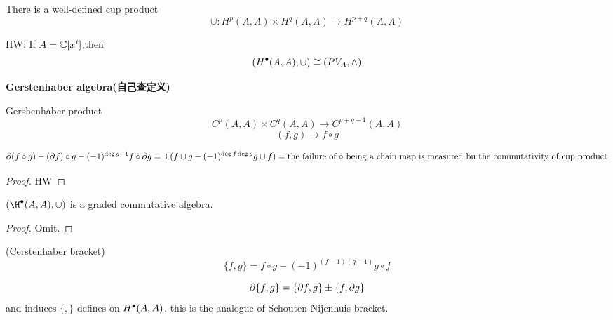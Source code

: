 
\begin{cor}
There is a well-defined cup product
$$\cup: H^p(A,A)\times H^{q}(A,A)\to H^{p+q}(A,A)$$
\end{cor}

HW: If $A=\mathbb{C}[x^i]$,then
$$(H^{\bullet}(A,A),\cup)\cong (PV_A,\wedge)$$

\textbf{Gerstenhaber algebra(自己查定义)}

\begin{definition}Gershenhaber product
$$C^{p}(A,A)\times C^q(A,A)\to C^{p+q-1}(A,A)$$
$$(f,g)\to f\circ g$$

\end{definition}

\begin{prop}
$$\partial(f\circ g)-(\partial f)\circ g-(-1)^{\deg g-1}f\circ\partial g
=\pm(f\cup g-(-1)^{\deg f\deg g}g\cup f)
=\text{the failure of $\circ$ being a chain map
is measured bu the commutativity of cup product}$$
\end{prop}

\begin{proof}
HW
\end{proof}

\begin{cor}
$(\H\updot(A,A),\cup)$ is a graded commutative algebra.
\end{cor}

\begin{proof}
Omit.
\end{proof}


\begin{definition}(Cerstenhaber bracket)
$$\{f,g\}=f\circ g-(-1)^{(f-1)(g-1)}g\circ f$$
\end{definition}

\begin{prop}
$$\partial\{f,g\}=\{\partial f,g\}\pm\{f,\partial g\}$$
and induces
$\{,\}$ defines on $H^{\bullet}(A,A)$.
this is  the analogue of Schouten-Nijenhuis bracket.
\end{prop}
